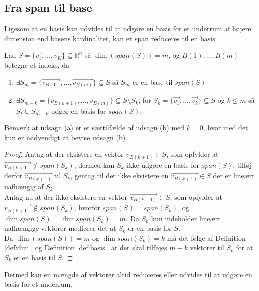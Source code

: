 \subsection{Fra span til base}
Ligesom at en basis kan udvides til at udgøre en basis for et underrum af højere dimension end basens kardinalitet, kan et span reduceres til en basis.
\begin{stn}
Lad $S=\{\vec{v_1},..., \vec{v_K}\} \subseteq \mathds{R}^n$ så $\dim(span(S)) = m$, og $B(1),...,B(m)$ betegne et indeks, da
\begin{enumerate}[label=\alph*]
\item $\exists S_m =\{\vec{v_{B(1)}},...,\vec{v_{B(m)}}\}\subseteq S$ så $S_m$ er en base til $span (S)$
\item $\exists S_{m-k} = \{v_{B(k+1)},...,v_{B(m)}\} \subseteq S\setminus S_k$, for $S_k = \{\vec{v_1},..., \vec{v_k}\} \subseteq S$ og $k \leq m$ så $S_k \cup S_{m-k}$ udgør en basis for $span(S)$.
\end{enumerate} 
\label{stn:spantilbasis}
\end{stn}
Bemærk at udsagn (a) er et særtilfælde af udsagn (b) med $k=0$, hvor med det kun er nødvendigt at bevise udsagn (b).
\begin{proof}
Antag at der eksistere en vektor $\vec{v_{B(k+1)}} \in S$, som opfylder at $\vec{v_{B(k+1)}} \notin span(S_k)$, dermed kan $S_k$ ikke udgøre en basis for $span(S)$, tilføj derfor $\vec{v_{B(k+1)}}$ til $S_k$, gentag til der ikke eksistere en $\vec{v_{B(k+1)}} \in S$ der er lineært uafhængig af $S_k$. 
\\Antag nu at der ikke eksistere en vektor $\vec{v_{B(k+1)}} \in S$, som opfylder at $\vec{v_{B(k+1)}} \notin span(S_k)$, hvorfor $span(S) = span(S_k)$, og $\dim{span(S)}=\dim{span(S_k)}= m$.
Da $S_k$ kun indeholder lineært uafhængige vektorer medfører det at $S_k$ er en basis for $S$.
\\Da $\dim(span(S)) = m$ og $\dim{span(S_k)}=k$ må det følge af Definition \ref{def:dim}, og Definition \ref{def:basis}, at der skal tilføjes $m-k$ vektorer til $S_k$ for at $S_k$ er en basis til $S$.
\end{proof} 
Dermed kan en mængde af vektorer altid reduceres eller udvides til at udgøre en basis for et underrum.


